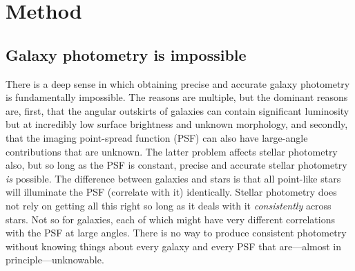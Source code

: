\documentclass[12pt,preprint,pdftex]{aastex}
\begin{document}
\section{Method} \label{sec:method}
\subsection{Galaxy photometry is impossible}\label{sec:philosophy}

There is a deep sense in which obtaining precise and accurate galaxy
photometry is fundamentally impossible.  The reasons are multiple, but
the dominant reasons are, first, that the angular outskirts of
galaxies can contain significant luminosity but at incredibly low
surface brightness and unknown morphology, and secondly, that the
imaging point-spread function (PSF) can also have large-angle
contributions that are unknown.  The latter problem affects stellar
photometry also, but so long as the PSF is constant, precise and
accurate stellar photometry \emph{is} possible.  The difference
between galaxies and stars is that all point-like stars will
illuminate the PSF (correlate with it) identically.  Stellar
photometry does not rely on getting all this right so long as it deals
with it \emph{consistently} across stars.  Not so for galaxies, each
of which might have very different correlations with the PSF at large
angles.  There is no way to produce consistent photometry without
knowing things about every galaxy and every PSF that are---almost in
principle---unknowable.
\end{document}
